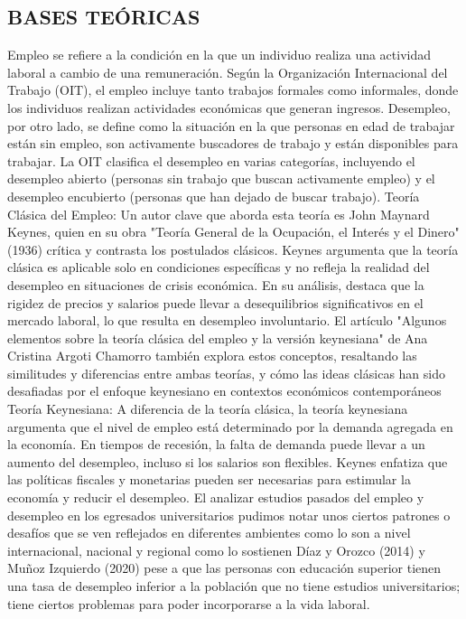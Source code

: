\documentclass[12pt, a4paper]{article}
\begin{document}
\subsection{BASES TEÓRICAS}
Empleo se refiere a la condición en la que un individuo realiza una actividad laboral a cambio de una remuneración. Según la Organización Internacional del Trabajo (OIT), el empleo incluye tanto trabajos formales como informales, donde los individuos realizan actividades económicas que generan ingresos.
Desempleo, por otro lado, se define como la situación en la que personas en edad de trabajar están sin empleo, son activamente buscadores de trabajo y están disponibles para trabajar. La OIT clasifica el desempleo en varias categorías, incluyendo el desempleo abierto (personas sin trabajo que buscan activamente empleo) y el desempleo encubierto (personas que han dejado de buscar trabajo).
Teoría Clásica del Empleo: Un autor clave que aborda esta teoría es John Maynard Keynes, quien en su obra "Teoría General de la Ocupación, el Interés y el Dinero" (1936) crítica y contrasta los postulados clásicos. Keynes argumenta que la teoría clásica es aplicable solo en condiciones específicas y no refleja la realidad del desempleo en situaciones de crisis económica. En su análisis, destaca que la rigidez de precios y salarios puede llevar a desequilibrios significativos en el mercado laboral, lo que resulta en desempleo involuntario.
El artículo "Algunos elementos sobre la teoría clásica del empleo y la versión keynesiana" de Ana Cristina Argoti Chamorro también explora estos conceptos, resaltando las similitudes y diferencias entre ambas teorías, y cómo las ideas clásicas han sido desafiadas por el enfoque keynesiano en contextos económicos contemporáneos
Teoría Keynesiana:
A diferencia de la teoría clásica, la teoría keynesiana argumenta que el nivel de empleo está determinado por la demanda agregada en la economía. En tiempos de recesión, la falta de demanda puede llevar a un aumento del desempleo, incluso si los salarios son flexibles. Keynes enfatiza que las políticas fiscales y monetarias pueden ser necesarias para estimular la economía y reducir el desempleo.
El analizar estudios pasados del empleo y desempleo en los egresados universitarios pudimos notar unos ciertos patrones o desafíos que se ven reflejados en diferentes ambientes como lo son a nivel internacional, nacional y regional como lo sostienen Díaz y Orozco (2014) y Muñoz Izquierdo (2020) pese a que las personas con educación superior tienen una tasa de desempleo inferior a la población que no tiene estudios universitarios; tiene ciertos problemas para poder incorporarse a la vida laboral.
\end{document}
